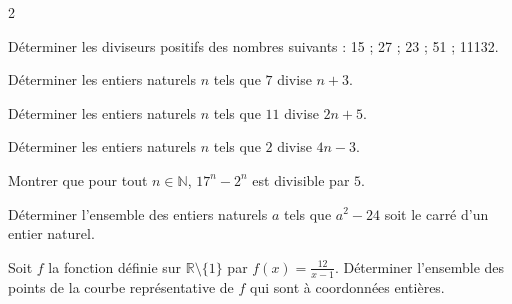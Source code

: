 \documentclass[a4paper,12pt]{article}
\title{
\centering
\tcbset{colframe=BlackSav,colback=GrayBG}
\tcbox[tikznode]{
Chapitre 3 \\ Divisibilité - Exercices
}
}
\author{}
\date{}
\begin{document}
\maketitle

\begin{multicols}{2}
\begin{exercice}[title=Exercice 1 $\quad \star \quad$ { [Calculer] }]{}{}
    Déterminer les diviseurs positifs des nombres suivants :
    15 ; 27 ; 23 ; 51 ; 11132.
    \end{exercice}
    
    \begin{exercice}[title=Exercice 2 $\quad \star \quad$ { [Calculer] }]{}{}
    Déterminer les entiers naturels $n$ tels que $7$ divise $n + 3$.
    \end{exercice}
    
    \begin{exercice}[title=Exercice 3 $\quad \star \quad$ { [Calculer] }]{}{}
    Déterminer les entiers naturels $n$ tels que $11$ divise $2n + 5$.
    \end{exercice}
    
    \begin{exercice}[title=Exercice 4 $\quad \star \quad$ { [Calculer] }]{}{}
    Déterminer les entiers naturels $n$ tels que $2$ divise $4n - 3$.
    \end{exercice}
    
    \begin{exercice}[title=Exercice 5 $\quad \star \star \quad$ { [Calculer, Raisonner] }]{}{}
    Montrer que pour tout $n \in \mathbb{N}$, $17^n - 2^n$ est divisible par $5$.
    \end{exercice}
    
    \begin{exercice}[title=Exercice 6 $\quad \star \star \quad$ { [Calculer, Raisonner] }]{}{}
    Déterminer l’ensemble des entiers naturels $a$ tels que $a^2 - 24$ soit le carré d’un entier naturel.
    \end{exercice}
    
    \begin{exercice}[title=Exercice 7 $\quad \star \star \quad$ { [Chercher, Représenter] }]{}{}
    Soit $f$ la fonction définie sur $\mathbb{R} \setminus \{1\}$ par $f(x) = \frac{12}{x - 1}$. Déterminer l’ensemble des points de la courbe représentative de $f$ qui sont à coordonnées entières.
    \end{exercice}
    

\end{multicols}
\end{document}
